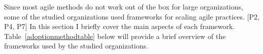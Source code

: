 Since most agile methods do not work out of the box for large
organizations, some of the studied organizations used frameworks for
scaling agile practices. [P2, P4, P7] In this section I briefly cover
the main aspects of each framework. Table~\ref{adoptionmethodtable} below will provide a brief overview
of the frameworks used by the studied organizations.

\bigskip
{
}
\bigskip
